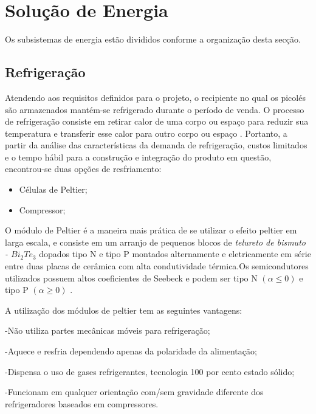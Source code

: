 \section{Solução de Energia}

Os subsistemas de energia estão divididos conforme a organização desta secção. 

\subsection{Refrigeração}
Atendendo aos requisitos definidos para o projeto, o recipiente no qual os picolés são armazenados  mantém-se refrigerado durante o período de venda. O processo de refrigeração consiste em retirar calor de uma corpo ou espaço para reduzir sua temperatura e transferir esse calor para outro corpo ou espaço \cite{campos2010refrigeraccao}. Portanto, a partir da análise das características da demanda de refrigeração, custos limitados e o tempo hábil para a construção e integração do produto em questão, encontrou-se duas opções de resfriamento:

\begin{itemize}
\item Células de Peltier;
\end{itemize}

\begin{itemize}
\item Compressor;
\end{itemize}


O módulo de Peltier é a maneira mais prática de se utilizar o efeito peltier em larga escala, e consiste em um arranjo de pequenos blocos de \textit{telureto de bismuto - $Bi_{2}Te_{3}$} dopados tipo N e tipo P montados alternamente e eletricamente em série entre duas placas de cerâmica com alta condutividade térmica.Os semicondutores utilizados possuem altos coeficientes de Seebeck e podem ser tipo N $(\alpha \leq 0)$ e tipo P $(\alpha \geq 0)$  \cite{campos2010refrigeraccao}.

A utilização dos módulos de peltier tem as seguintes vantagens:

-Não utiliza partes mecânicas móveis para refrigeração;

-Aquece e resfria dependendo apenas da polaridade da alimentação;

-Dispensa o uso de gases refrigerantes, tecnologia 100 por cento estado sólido;

-Funcionam em qualquer orientação com/sem gravidade diferente dos refrigeradores baseados em compressores.


